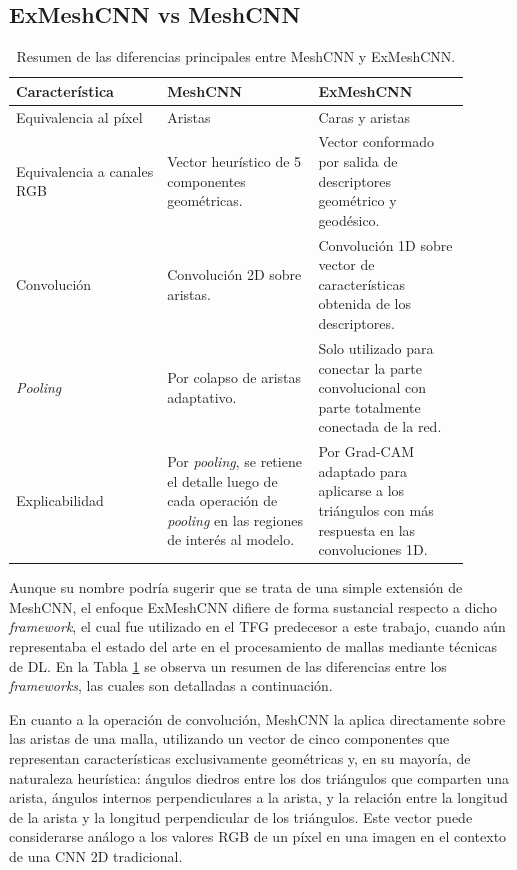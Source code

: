 \subsection{ExMeshCNN vs MeshCNN}
\label{exmeshcnn_vs_meshcnn}

\begin{table}[h]
    \centering
    \begin{tabular}{|p{0.3\linewidth}|p{0.3\linewidth}|p{0.3\linewidth}|}
    \hline
    \rowcolor[HTML]{D33333} 
    {\color[HTML]{FFFFFF} \textbf{Característica}} & {\color[HTML]{FFFFFF} \textbf{MeshCNN}} & {\color[HTML]{FFFFFF} \textbf{ExMeshCNN}} \\ \hline
    Equivalencia al píxel & Aristas & Caras y aristas \\ \hline
    Equivalencia a canales RGB & Vector heurístico de 5 componentes geométricas. & Vector conformado por salida de descriptores geométrico y geodésico. \\ \hline
    Convolución & Convolución 2D sobre aristas. & Convolución 1D sobre vector de características obtenida de los descriptores. \\ \hline
    \textit{Pooling} & Por colapso de aristas adaptativo. & Solo utilizado para conectar la parte convolucional con parte totalmente conectada de la red. \\ \hline
    Explicabilidad & Por \textit{pooling}, se retiene el detalle luego de cada operación de \textit{pooling} en las regiones de interés al modelo. & Por Grad-CAM adaptado para aplicarse a los triángulos con más respuesta en las convoluciones 1D. \\ \hline
    \end{tabular}
    \caption[Resumen de las diferencias entre MeshCNN y ExMeshCNN]{Resumen de las diferencias principales entre MeshCNN y ExMeshCNN.}
    \label{meshcnn_vs_exmeshcnn}
\end{table}

Aunque su nombre podría sugerir que se trata de una simple extensión de MeshCNN, el enfoque ExMeshCNN difiere de forma sustancial respecto a dicho \textit{framework}, el cual fue utilizado en el TFG predecesor a este trabajo, cuando aún representaba el estado del arte en el procesamiento de mallas mediante técnicas de DL. En la Tabla \ref{meshcnn_vs_exmeshcnn} se observa un resumen de las diferencias entre los \textit{frameworks}, las cuales son detalladas a continuación.

En cuanto a la operación de convolución, MeshCNN la aplica directamente sobre las aristas de una malla, utilizando un vector de cinco componentes que representan características exclusivamente geométricas y, en su mayoría, de naturaleza heurística: ángulos diedros entre los dos triángulos que comparten una arista, ángulos internos perpendiculares a la arista, y la relación entre la longitud de la arista y la longitud perpendicular de los triángulos. Este vector puede considerarse análogo a los valores RGB de un píxel en una imagen en el contexto de una CNN 2D tradicional.

